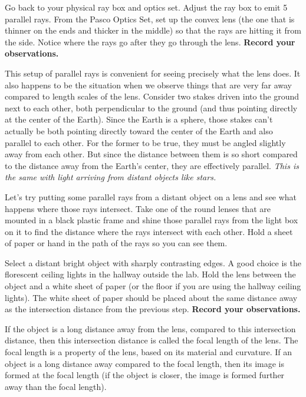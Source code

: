 \begin{steps}
	\item Go back to your physical ray box and optics set. Adjust the ray box to emit 5 parallel rays. From the Pasco Optics Set, set up the convex lens (the one that is thinner on the ends and thicker in the middle) so that the rays are hitting it from the side. Notice where the rays go after they go through the lens. \textbf{Record your observations.}
\end{steps}

This setup of parallel rays is convenient for seeing precisely what the lens does. It also happens to be the situation when we observe things that are very far away compared to length scales of the lens. Consider two stakes driven into the ground next to each other, both perpendicular to the ground (and thus pointing directly at the center of the Earth). Since the Earth is a sphere, those stakes can't actually be both pointing directly toward the center of the Earth and also parallel to each other. For the former to be true, they must be angled slightly away from each other. But since the distance between them is so short compared to the distance away from the Earth's center, they are effectively parallel. \textit{This is the same with light arriving from distant objects like stars.}

\begin{steps}
	\item Let's try putting some parallel rays from a distant object on a lens and see what happens where those rays intersect. Take one of the round lenses that are mounted in a black plastic frame and shine those parallel rays from the light box on it to find the distance where the rays intersect with each other. Hold a sheet of paper or hand in the path of the rays so you can see them.
	
	\item Select a distant bright object with sharply contrasting edges. A good choice is the florescent ceiling lights in the hallway outside the lab. Hold the lens between the object and a white sheet of paper (or the floor if you are using the hallway ceiling lights). The white sheet of paper should be placed about the same distance away as the intersection distance from the previous step. \textbf{Record your observations.}
\end{steps}

If the object is a long distance away from the lens, compared to this intersection distance, then this intersection distance is called the focal length of the lens. The focal length is a property of the lens, based on its material and curvature. If an object is a long distance away compared to the focal length, then its image is formed at the focal length (if the object is closer, the image is formed further away than the focal length).

